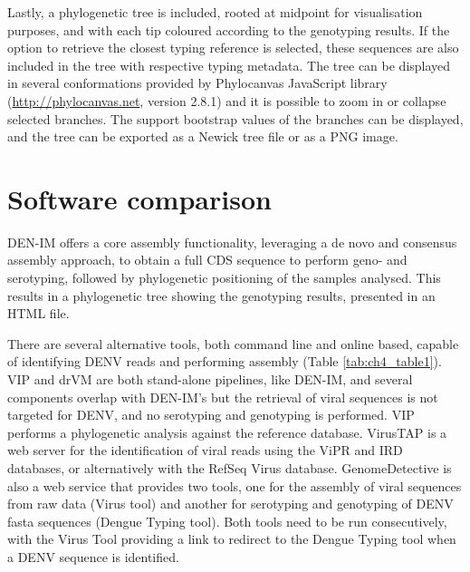 Lastly, a phylogenetic tree is included, rooted at midpoint for visualisation purposes, and with each tip coloured according to the genotyping results. If the option to retrieve the closest typing reference is selected, these sequences are also included in the tree with respective typing metadata. The tree can be displayed in several conformations provided by Phylocanvas JavaScript library (\url{http://phylocanvas.net}, version 2.8.1) and it is possible to zoom in or collapse selected branches. The support bootstrap values of the branches can be displayed, and the tree can be exported as a Newick tree file or as a PNG image.

\section{Software comparison}

DEN-IM offers a core assembly functionality, leveraging a de novo and consensus assembly approach, to obtain a full CDS sequence to perform geno- and serotyping, followed by phylogenetic positioning of the samples analysed. This results in a phylogenetic tree showing the genotyping results, presented in an HTML file.

There are several alternative tools, both command line and online based, capable of identifying DENV reads and performing assembly (Table \ref{tab:ch4_table1}). VIP and drVM are both stand-alone pipelines, like DEN-IM, and several components overlap with DEN-IM’s but the retrieval of viral sequences is not targeted for DENV, and no serotyping and genotyping is performed. VIP performs a phylogenetic analysis against the reference database. VirusTAP is a web server for the identification of viral reads using the ViPR and IRD databases, or alternatively with the RefSeq Virus database. GenomeDetective is also a web service that provides two tools, one for the assembly of viral sequences from raw data (Virus tool) and another for serotyping and genotyping of DENV fasta sequences (Dengue Typing tool). Both tools need to be run consecutively, with the Virus Tool providing a link to redirect to the Dengue Typing tool when a DENV sequence is identified.




